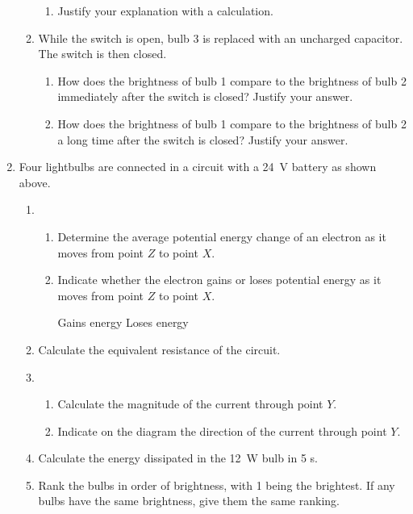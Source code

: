 \documentclass{../../../oss-classkick}
\begin{document}
\begin{enumerate}
\begin{enumerate}
\begin{enumerate}
    \item Justify your explanation with a calculation.
      \vspace{1.5in}
    \end{enumerate}
  \item While the switch is open, bulb 3 is replaced with an uncharged
    capacitor. The switch is then closed.
    \begin{enumerate}
    \item How does the brightness of bulb 1 compare to the brightness of bulb 2
      immediately after the switch is closed? Justify your answer.
      \vspace{1.5in}
    \item How does the brightness of bulb 1 compare to the brightness of bulb 2
      a long time after the switch is closed? Justify your answer.
    \end{enumerate}
  \end{enumerate}
  \newpage

  \begin{center}
  \end{center}
\item Four lightbulbs are connected in a circuit with a \SI{24}{\volt} battery
  as shown above.
  \begin{enumerate}
  \item
    \begin{enumerate}
    \item Determine the average potential energy change of an electron as it
      moves from point $Z$ to point $X$.
    \item Indicate whether the electron gains or loses potential energy as it
      moves from point $Z$ to point $X$.

      \vspace{.1in}
      \underline{\hspace{.5in}} Gains energy\vspace{.3in}
      \underline{\hspace{.5in}} Loses energy
      \vspace{.2in}
    \end{enumerate}
  \item Calculate the equivalent resistance of the circuit.
  \item
    \begin{enumerate}
    \item Calculate the magnitude of the current through point $Y$.
    \item Indicate on the diagram the direction of the current through point
      $Y$.
    \end{enumerate}
  \item Calculate the energy dissipated in the \SI{12}{\watt} bulb in 5 s.
  \item Rank the bulbs in order of brightness, with 1 being the brightest. If
    any bulbs have the same brightness, give them the same ranking.


\end{enumerate}
\end{enumerate}
\end{document}
